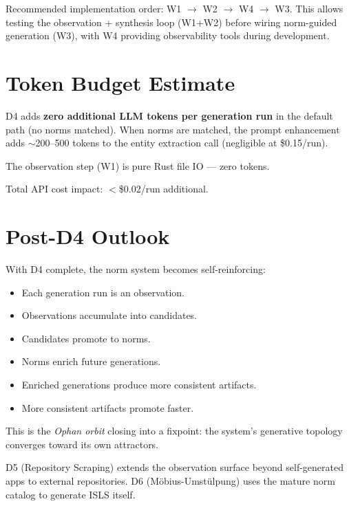\documentclass[11pt,a4paper]{article}
\begin{document}
Recommended implementation order: W1 $\to$ W2 $\to$ W4 $\to$ W3. 
This allows testing the observation + synthesis loop (W1+W2) before 
wiring norm-guided generation (W3), with W4 providing observability 
tools during development.


\section{Token Budget Estimate}

D4 adds \textbf{zero additional LLM tokens per generation run} in the 
default path (no norms matched). When norms are matched, the prompt 
enhancement adds $\sim$200--500 tokens to the entity extraction call 
(negligible at \$0.15/run).

The observation step (W1) is pure Rust file IO --- zero tokens.

Total API cost impact: $<$\$0.02/run additional.


\section{Post-D4 Outlook}

With D4 complete, the norm system becomes self-reinforcing:

\begin{itemize}[nosep]
\item Each generation run is an observation.
\item Observations accumulate into candidates.
\item Candidates promote to norms.
\item Norms enrich future generations.
\item Enriched generations produce more consistent artifacts.
\item More consistent artifacts promote faster.
\end{itemize}

This is the \emph{Ophan orbit} closing into a fixpoint: the system's 
generative topology converges toward its own attractors.

D5 (Repository Scraping) extends the observation surface beyond 
self-generated apps to external repositories. D6 (M\"obius-Umst\"ulpung) 
uses the mature norm catalog to generate ISLS itself.
\end{document}
